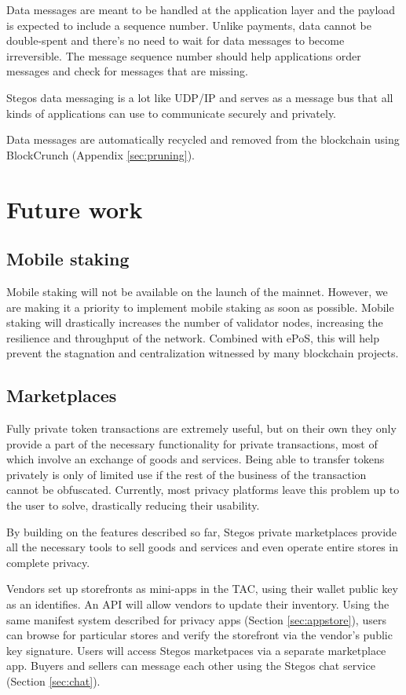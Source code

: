 \documentclass[8pt,fleqn,openany]{book}
\begin{document}
Data messages are meant to be handled at the application layer and the payload is expected to include a sequence number. Unlike payments, data cannot be double-spent and there’s no need to wait for data messages to become irreversible. The message sequence number should help applications order messages and check for messages that are missing. 

Stegos data messaging is a lot like UDP/IP and serves as a message bus that all kinds of applications can use to communicate securely and privately.

Data messages are automatically recycled and removed from the blockchain using BlockCrunch (Appendix \ref{sec:pruning}).

\chapter{Future work}\label{chap:future-work}

\section{Mobile staking}\label{sec:mobile-staking}
Mobile staking will not be available on the launch of the mainnet. However, we are making it a priority to implement mobile staking as soon as possible. Mobile staking will drastically increases the number of validator nodes, increasing the resilience and throughput of the network. Combined with ePoS, this will help prevent the stagnation and centralization witnessed by many blockchain projects.
	
\section{Marketplaces}\label{sec:marketplaces}
Fully private token transactions are extremely useful, but on their own they only provide a part of the necessary functionality for private transactions, most of which involve an exchange of goods and services. Being able to transfer tokens privately is only of limited use if the rest of the business of the transaction cannot be obfuscated. Currently, most privacy platforms leave this problem up to the user to solve, drastically reducing their usability.

By building on the features described so far, Stegos private marketplaces provide all the necessary tools to sell goods and services and even operate entire stores in complete privacy.

Vendors set up storefronts as mini-apps in the TAC, using their wallet public key as an identifies. An API will allow vendors to update their inventory. Using the same manifest system described for privacy apps (Section \ref{sec:appstore}), users can browse for particular stores and verify the storefront via the vendor’s public key signature. Users will access Stegos marketpaces via a separate marketplace app. Buyers and sellers can message each other using the Stegos chat service (Section \ref{sec:chat}). 
\end{document}
